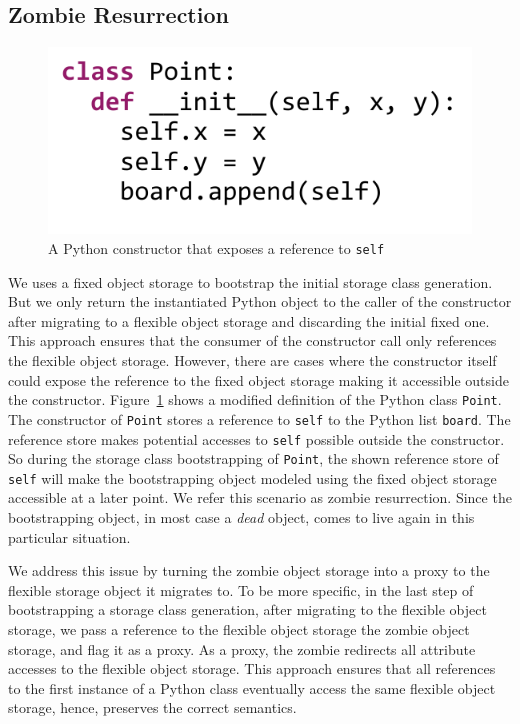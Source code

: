\subsection{Zombie Resurrection}
\label{sec:ch5-zombie-resurrection}

\begin{figure}
\centering
\includegraphics[scale=.7]{figures/ch5-python-class-point-with-zombie-store-code}
\caption{A Python constructor that exposes a reference to \texttt{self}}
\label{fig:ch5-python-class-point-with-zombie-store-code}
\end{figure}

We uses a fixed object storage to bootstrap the initial storage class generation.
But we only return the instantiated Python object to the caller of the constructor after migrating to a flexible object storage and discarding the initial fixed one.
This approach ensures that the consumer of the constructor call only references the flexible object storage.
However, there are cases where the constructor itself could expose the reference to the fixed object storage making it accessible outside the constructor.
Figure~\ref{fig:ch5-python-class-point-with-zombie-store-code} shows a modified definition of the Python class \texttt{Point}.
The constructor of \texttt{Point} stores a reference to \texttt{self} to the Python list \texttt{board}.
The reference store makes potential accesses to \texttt{self} possible outside the constructor.
So during the storage class bootstrapping of \texttt{Point}, the shown reference store of \texttt{self} will make the bootstrapping object modeled using the fixed object storage accessible at a later point.
We refer this scenario as zombie resurrection.
Since the bootstrapping object, in most case a \emph{dead} object, comes to live again in this particular situation.

We address this issue by turning the zombie object storage into a proxy to the flexible storage object it migrates to.
To be more specific, in the last step of bootstrapping a storage class generation, after migrating to the flexible object storage, we pass a reference to the flexible object storage the zombie object storage, and flag it as a proxy.
As a proxy, the zombie redirects all attribute accesses to the flexible object storage.
This approach ensures that all references to the first instance of a Python class eventually access the same flexible object storage, hence, preserves the correct semantics.

